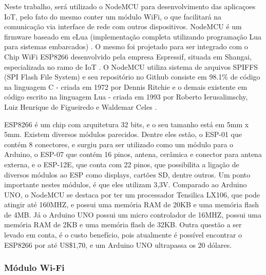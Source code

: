 \documentclass[journal]{IEEEtran}
\begin{document}
Neste trabalho, será utilizado o NodeMCU para desenvolvimento das aplicaçoes IoT, pelo fato do mesmo conter um módulo WiFi, o que facilitará na comunicação via interface de rede com outros dispositivos. NodeMCU é um firmware baseado em eLua (implementação completa utilizando programação Lua para sistemas embarcados) \cite{elua2017}. O mesmo foi projetado para ser integrado com o Chip WiFi ESP8266 desenvolvido pela empresa Espressif, situada em Shangai, especializada no ramo de IoT \cite{systems}. O NodeMCU utiliza sistema de arquivos SPIFFS (SPI Flash File System) e seu repositório no Github consiste em 98.1\% de código na linguagem C - criada em 1972 por Dennis Ritchie \cite{williamstewart2017} e o demais existente em código escrito na linguagem Lua  - criada em 1993 por Roberto Ierusalimschy, Luiz Henrique de Figueiredo e Waldemar Celes \cite{lua2017Authors}.

ESP8266 é um chip com arquitetura 32 bits, e o seu tamanho está em 5mm x 5mm. Existem diversos módulos parecidos. Dentre eles estão, o ESP-01 que contém 8 conectores, e surgiu para ser utilizado como um módulo para o Arduino, o ESP-07 que contém 16 pinos, antena, cerâmica e conector para antena externa, e o ESP-12E, que conta com 22 pinos, que possibilita a ligação de diversos módulos ao ESP como displays, cartões SD, dentre outros. Um ponto importante nestes módulos, é que eles utilizam 3,3V. Comparado ao Arduino UNO, o NodeMCU se destaca por ter um processador Tensilica LX106, que pode atingir até 160MHZ, e possui uma memória RAM de 20KB e uma memória flash de 4MB. Já o Arduino UNO possui um micro controlador de 16MHZ, possui uma memória RAM de 2KB e uma memória flash de 32KB. Outra questão a ser levado em conta, é o custo benefício, pois atualmente é possível encontrar o ESP8266 por até US\$1,70, e um Arduino UNO ultrapassa os 20 dólares\cite{IrvingNodeMCU}.


\subsubsection{Módulo Wi-Fi}
\end{document}
